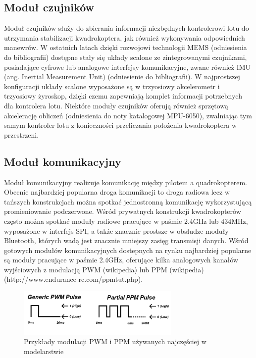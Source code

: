 \subsection{Moduł czujników}

Moduł czujników służy do zbierania informacji niezbędnych kontrolerowi lotu do utrzymania stabilizacji kwadrokoptera, jak również wykonywania odpowiednich manewrów. W ostatnich latach dzięki rozwojowi technologii MEMS (odniesienia do bibliografii) dostępne stały się układy scalone ze zintegrowanymi czujnikami, posiadające cyfrowe lub analogowe interfejsy komunikacyjne, zwane również IMU (ang. Inertial Measurement Unit) (odniesienie do bibliografii). W najprostszej konfiguracji układy scalone wyposażone są w trzyosiowy akcelerometr i trzyosiowy żyroskop, dzięki czemu zapewniają komplet informacji potrzebnych dla kontrolera lotu. Niektóre moduły czujników oferują również sprzętową akcelerację obliczeń (odniesienia do noty katalogowej MPU-6050), zwalniając tym samym kontroler lotu z konieczności przeliczania położenia kwadrokoptera w przestrzeni. 

\subsection{Moduł komunikacyjny}

Moduł komunikacyjny realizuje komunikację między pilotem a quadrokopterem. Obecnie najbardziej popularna droga komunikacji to droga radiowa lecz w tańszych konstrukcjach można spotkać jednostronną komunikację wykorzystującą promieniowanie podczerwone. Wśród prywatnych konstrukcji kwadrokopterów często można spotkać moduły radiowe pracujące w paśmie 2.4GHz lub 434MHz, wyposażone w interfejs SPI, a także znacznie prostsze w obsłudze moduły Bluetooth, których wadą jest znacznie mniejszy zasięg transmisji danych. Wśród gotowych modułów komunikacyjnych dostepnych na rynku najbardziej popularne są moduły pracujące w paśmie 2.4GHz, oferujące kilka analogowych kanałów wyjściowych z modulacją PWM (wikipedia) lub PPM (wikipedia)(http://www.endurance-rc.com/ppmtut.php). 

\begin{figure}[H]
	\centering
		\includegraphics[width=0.7\textwidth]{Pictures/quadrotor_controller_pwm_ppm.png}
	\caption[Przykłady modulacji w modelarstwie]{Przykłady modulacji PWM i PPM używanych najczęściej w modelarstwie}
	\label{fig:quadrotor_modules.png}
\end{figure}

